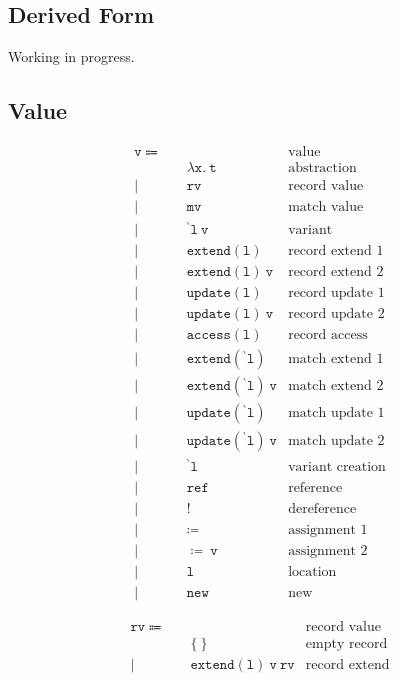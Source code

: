 \documentclass{report}
\newcommand{\code}{\mathtt}
\newcommand{\backtick}{{}^{\backprime}}
\begin{document}
\subsection{Derived Form}

Working in progress.

\subsection{Value}

\begin{align*}
\code{v} \Coloneqq \quad & & \text{value} \\
& \code{\lambda x.\ t} & \text{abstraction} \\
| \quad & \code{rv} & \text{record value} \\
| \quad & \code{mv} & \text{match value} \\
| \quad & \code{\backtick l\ v} & \text{variant} \\
| \quad & \code{extend(l)} & \text{record extend 1} \\
| \quad & \code{extend(l)\ v} & \text{record extend 2} \\
| \quad & \code{update(l)} & \text{record update 1} \\
| \quad & \code{update(l)\ v} & \text{record update 2} \\
| \quad & \code{access(l)} & \text{record access} \\
| \quad & \code{extend(\backtick l)} & \text{match extend 1} \\
| \quad & \code{extend(\backtick l)\ v} & \text{match extend 2} \\
| \quad & \code{update(\backtick l)} & \text{match update 1} \\
| \quad & \code{update(\backtick l)\ v} & \text{match update 2} \\
| \quad & \code{\backtick l} & \text{variant creation} \\
| \quad & \code{ref} & \text{reference} \\
| \quad & \code{!} & \text{dereference} \\
| \quad & \code{\coloneqq} & \text{assignment 1} \\
| \quad & \code{\coloneqq\ v} & \text{assignment 2} \\
| \quad & \code{l} & \text{location} \\
| \quad & \code{new} & \text{new}
\end{align*}

\begin{align*}
\code{rv} \Coloneqq \quad & & \text{record value} \\
& \code{\{\ \}} & \text{empty record} \\
| \quad & \code{extend(l)\ v\ rv} & \text{record extend}
\end{align*}
\end{document}
